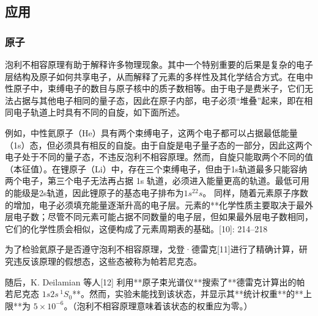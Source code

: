 \subsection{应用}  
\subsubsection{原子} 
泡利不相容原理有助于解释许多物理现象。其中一个特别重要的后果是复杂的电子层结构及原子如何共享电子，从而解释了元素的多样性及其化学结合方式。在电中性原子中，束缚电子的数目与原子核中的质子数相等。由于电子是费米子，它们无法占据与其他电子相同的量子态，因此在原子内部，电子必须“堆叠”起来，即在相同电子轨道上时具有不同的自旋，如下面所述。

例如，中性氦原子（He）具有两个束缚电子，这两个电子都可以占据最低能量（1s）态，但必须具有相反的自旋。由于自旋是电子量子态的一部分，因此这两个电子处于不同的量子态，不违反泡利不相容原理。然而，自旋只能取两个不同的值（本征值）。在锂原子（Li）中，存在三个束缚电子，但由于1s轨道最多只能容纳两个电子，第三个电子无法再占据 1s 轨道，必须进入能量更高的轨道。最低可用的能级是2s轨道，因此锂原子的基态电子排布为\(1s^22s\)。 同样，随着元素原子序数的增加，电子必须填充能量逐渐升高的电子层。元素的**化学性质主要取决于最外层电子数；尽管不同元素可能占据不同数量的电子层，但如果最外层电子数相同，它们的化学性质会相似，这便构成了元素周期表的基础。[10]: 214–218

为了检验氦原子是否遵守泡利不相容原理，戈登·德雷克[11]进行了精确计算，研究违反该原理的假想态，这些态被称为帕若尼克态。  

随后，K. Deilamian 等人[12] 利用**原子束光谱仪**搜索了**德雷克计算出的帕若尼克态 \( 1s2s \, ^1S_0 \)**。然而，实验未能找到该状态，并显示其**统计权重**的**上限**为 \( 5 \times 10^{-6} \)。（泡利不相容原理意味着该状态的权重应为零。）